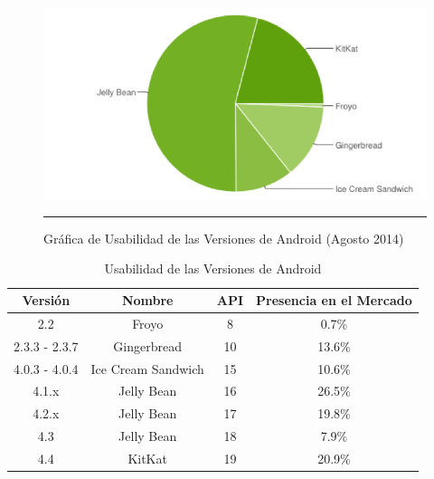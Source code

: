 \begin{figure}[htbp]
	\centering
		\includegraphics[width=1\textwidth]{Figuras/versionesAndroid.png}
		\rule{30em}{0.5pt}
	\caption[Gráfica de Usabilidad de las Versiones de Android]{Gráfica de Usabilidad de las Versiones de Android (Agosto 2014) \cite{devAndroid}}
	\label{fig:versionesFigura}
\end{figure}

\begin{table} 
	\begin{center}
		\begin{tabular}{|c|c|c|c|}
			\hline \rowcolor[RGB]{0,102,204} 
			\textcolor{blanco}{\bf Versión} &
				\textcolor{blanco}{\bf Nombre} &
				\textcolor{blanco}{\bf API} &
				\textcolor{blanco}{\bf Presencia en el Mercado} \\
			\hline \rowcolor[RGB]{224,224,224} 
				2.2 &
				Froyo &
				8 &
				0.7\% \\
      		\hline 
      			2.3.3 - 2.3.7 &
				Gingerbread &
				10 &
				13.6\% \\
      		\hline \rowcolor[RGB]{224,224,224} 
      			4.0.3 - 4.0.4 &
				Ice Cream Sandwich &
				15 &
				10.6\% \\
      		\hline 
      			4.1.x &
				Jelly Bean &
				16 &
				26.5\% \\
      		\hline \rowcolor[RGB]{224,224,224} 
      			4.2.x &
				Jelly Bean &
				17 &
				19.8\% \\
      		\hline 
      			4.3 &
				Jelly Bean &
				18 &
				7.9\% \\
      		\hline \rowcolor[RGB]{224,224,224} 
      			4.4 &
				KitKat &
				19 &
				20.9\% \\
      		\hline 
		\end{tabular}
	\end{center}
	\caption[Usabilidad de las Versiones de Android]{Usabilidad de las Versiones de Android \cite{devAndroid}} 
	\label{tab:versionesTabla}
\end{table}

